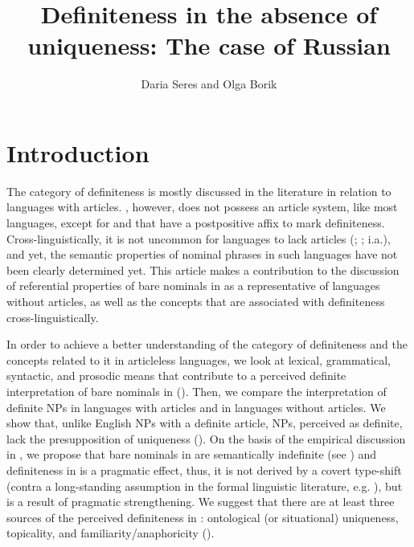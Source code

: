 \documentclass[output=paper]{langscibook}
\author{Daria Seres\orcid{0000-0002-9044-8516}\affiliation{Universitat Autònoma de Barcelona (UAB)} and Olga Borik\orcid{0000-0003-1255-5962}\affiliation{Universidad Nacional de Educación a Distancia (UNED)}}
\title{Definiteness in the absence of uniqueness: The case of Russian}
\begin{document}
\maketitle


\section{Introduction} \label{sec:seres:intro}
The category of definiteness is mostly discussed in the literature in relation to languages with articles. , however, does not possess an article system, like most  languages, except for  and  that have a postpositive affix to mark definiteness. Cross-linguistically, it is not uncommon for languages to lack articles (\citealt{Lyons1999}; %
\citealt{Dryer2013}; %
i.a.), and yet, the semantic properties of nominal phrases in such languages have not been clearly determined yet. This article makes a contribution to the discussion of referential properties of bare nominals in  as a representative of languages without articles, as well as the concepts that are associated with definiteness cross-linguistically. %

In order to achieve a better understanding of the category of definiteness and the concepts related to it in articleless languages, we look at lexical, grammatical, syntactic, and prosodic means that contribute to a perceived definite interpretation of bare nominals in  (). Then, we compare the interpretation of definite NPs in languages with articles and in languages without articles. %
We show that, unlike English NPs with a definite article,  NPs, perceived as definite, lack the presupposition of uniqueness (). On the basis of the empirical discussion in , we propose that bare nominals in  are semantically indefinite (see \citealt{Heim2011}) and definiteness in  is a pragmatic effect, thus, it is not derived by a covert type-shift (contra a long-standing assumption in the formal linguistic literature, e.g. \citealt{Chierchia1998}), but is a result of pragmatic strengthening. We suggest that there are at least three sources of the perceived definiteness in : ontological (or situational) uniqueness, topicality, and familiarity/anaphoricity ().
\end{document}
